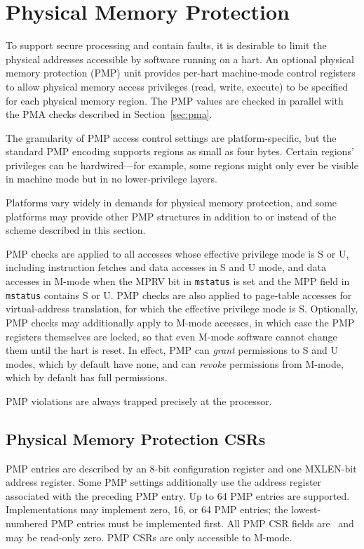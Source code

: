 \section{Physical Memory Protection}
\label{sec:pmp}

To support secure processing and contain faults, it is desirable to
limit the physical addresses accessible by software running on a hart.
An optional physical memory protection (PMP) unit provides
per-hart machine-mode control registers to allow
physical memory access privileges (read, write, execute) to be
specified for each physical memory region.  The PMP values are checked
in parallel with the PMA checks described in Section~\ref{sec:pma}.

The granularity of PMP access control settings are platform-specific,
but the standard PMP
encoding supports regions as small as four bytes.  Certain regions' privileges
can be hardwired---for example, some regions might only ever be visible in
machine mode but in no lower-privilege layers.

\begin{commentary}
Platforms vary widely in demands for physical memory protection, and
some platforms may provide other PMP structures in addition to or
instead of the scheme described in this section.
\end{commentary}

PMP checks are applied to all accesses whose effective privilege mode is S or
U, including instruction fetches and data accesses in S and U mode, and data
accesses in M-mode when the MPRV bit in {\tt mstatus} is set and the MPP
field in {\tt mstatus} contains S or U.
PMP checks are also applied to page-table
accesses for virtual-address translation, for which the effective
privilege mode is S.  Optionally, PMP checks may additionally apply
to M-mode accesses, in which case the PMP registers themselves are
locked, so that even M-mode software cannot change them until the hart is
reset.  In effect, PMP can {\em grant} permissions to S and U
modes, which by default have none, and can {\em revoke} permissions
from M-mode, which by default has full permissions.

PMP violations are always trapped precisely at the processor.

\subsection{Physical Memory Protection CSRs}

PMP entries are described by an 8-bit configuration register and one MXLEN-bit
address register.  Some PMP settings additionally use the address register
associated with the preceding PMP entry.
Up to 64 PMP entries are supported.
Implementations may implement zero, 16, or 64 PMP entries; the lowest-numbered
PMP entries must be implemented first.
All PMP CSR fields are \warl\ and may be read-only zero.
PMP CSRs are only accessible to M-mode.

